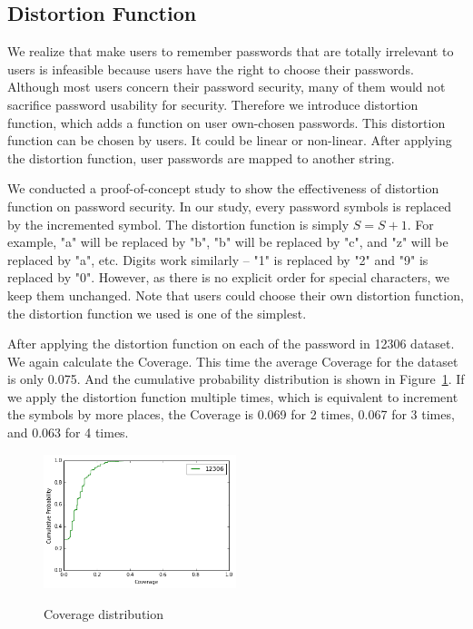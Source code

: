 \documentclass{sig-alternate}
\begin{document}
\subsection{Distortion Function}
We realize that make users to remember passwords that are totally irrelevant to users is infeasible because users have the right to choose their passwords. Although most users concern their password security, many of them would not sacrifice password usability for security. Therefore we introduce distortion function, which adds a function on user own-chosen passwords. This distortion function can be chosen by users. It could be linear or non-linear. After applying the distortion function, user passwords are mapped to another string. 

We conducted a proof-of-concept study to show the effectiveness of distortion function on password security. In our study, every password symbols is replaced by the incremented symbol. The distortion function is simply $S = S + 1$. For example, "a" will be replaced by "b", "b" will be replaced by "c", and "z" will be replaced by "a", etc. Digits work similarly -- "1" is replaced by "2" and "9" is replaced by "0". However, as there is no explicit order for special characters, we keep them unchanged. Note that users could choose their own distortion function, the distortion function we used is one of the simplest.

After applying the distortion function on each of the password in 12306 dataset. We again calculate the Coverage. This time the average Coverage for the dataset is only 0.075. And the cumulative probability distribution is shown in Figure~\ref{f4}. If we apply the distortion function multiple times, which is equivalent to increment the symbols by more places, the Coverage is 0.069 for 2 times, 0.067 for 3 times, and 0.063 for 4 times.

\begin{figure}[h!]
\centering
  \caption{Coverage distribution}{}
  \label{f4}
  \centering
    \includegraphics[width=0.5\textwidth]{fig/dist1}
\end{figure}
\end{document}
